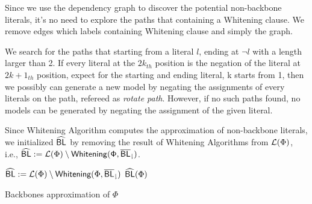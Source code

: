  Since we use the dependency graph to discover the potential non-backbone literals, it's no need to explore the paths that containing a Whitening clause. We remove edges which labels containing Whitening clause and simply the graph.

 We search for the paths that starting from a literal $l$, ending at $\neg l$ with a length larger than 2. If every literal at the $2k_{th}$ position is the negation of the literal at $2k+1_{th}$ position, expect for the starting and ending literal, k starts from 1, then we possibly can generate a new model by negating the assignments of every literals on the path, refereed as \emph{rotate path}. However, if no such paths found, no models can be generated by negating the assignment of the given literal.

  Since Whitening Algorithm computes the approximation of non-backbone literals, we initialized ${\sf \widehat{BL}}$ by removing the result of Whitening Algorithms from ${\cal L}(\Phi)$, i.e., ${\sf \widehat{BL}}:={\cal L}(\Phi)\setminus{\sf Whitening(\Phi,{\sf \overline{BL}_\downharpoonright})}$.


\begin{algorithm}
\SetAlgoShortEnd
\SetFillComment
{}
 
${\sf \widehat{BL}}:={\cal L}(\Phi)\setminus{\textsf{Whitening}}(\Phi,{\sf \overline{BL}_\downharpoonright})$\;
\Return ${\sf \widehat{BL}}(\Phi)$\;
\caption{Backbones approximation of $\Phi$}
\label{alg:nBLo}
\end{algorithm}

